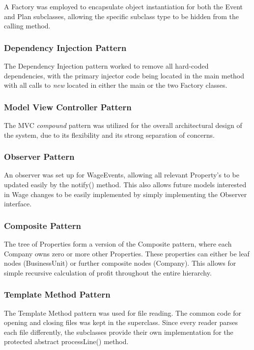 \documentclass[]{article}
\begin{document}
A Factory was employed to encapsulate object instantiation for both the Event and Plan subclasses, allowing the specific subclass type to be hidden from the calling method.

\subsubsection*{Dependency Injection Pattern}

The Dependency Injection pattern worked to remove all hard-coded dependencies, with the primary injector code being located in the main method with all calls to \textit{new} located in either the main or the two Factory classes.

\subsubsection*{Model View Controller Pattern}

The MVC \textit{compound} pattern was utilized for the overall architectural design of the system, due to its flexibility and its strong separation of concerns.

\subsubsection*{Observer Pattern}

An observer was set up for WageEvents, allowing all relevant Property's to be updated easily by the notify() method. This also allows future models interested in Wage changes to be easily implemented by simply implementing the Observer interface.

\subsubsection*{Composite Pattern}

The tree of Properties form a version of the Composite pattern, where each Company owns zero or more other Properties. These properties can either be leaf nodes (BusinessUnit) or further composite nodes (Company). This allows for simple recursive calculation of profit throughout the entire hierarchy.

\subsubsection*{Template Method Pattern}

The Template Method pattern was used for file reading. The common code for opening and closing files was kept in the superclass. Since every reader parses each file differently, the subclasses provide their own implementation for the protected abstract processLine() method.
\end{document}
